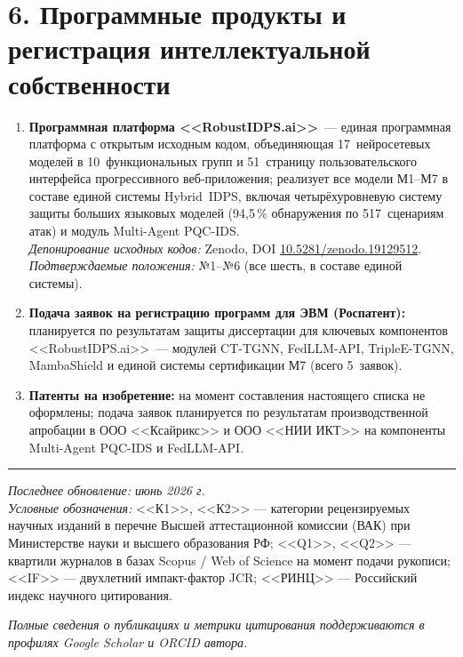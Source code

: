 \documentclass[11pt,a4paper]{article}
\begin{document}
\section*{6. Программные продукты и регистрация интеллектуальной собственности}

\begin{enumerate}[leftmargin=*, itemsep=0.3em]

\item \textbf{Программная платформа <<RobustIDPS.ai>>}~--- единая программная платформа с открытым исходным кодом, объединяющая 17~нейросетевых моделей в 10~функциональных групп и 51~страницу пользовательского интерфейса прогрессивного веб-приложения; реализует все модели М1--М7 в составе единой системы Hybrid~IDPS, включая четырёхуровневую систему защиты больших языковых моделей (94{,}5\,\% обнаружения по 517~сценариям атак) и модуль Multi-Agent PQC-IDS. \\
\textit{Депонирование исходных кодов:} Zenodo, DOI \href{https://doi.org/10.5281/zenodo.19129512}{10.5281/zenodo.19129512}. \\
\textit{Подтверждаемые положения:} №1--№6 (все шесть, в составе единой системы).

\item \textbf{Подача заявок на регистрацию программ для ЭВМ (Роспатент):} планируется по результатам защиты диссертации для ключевых компонентов <<RobustIDPS.ai>>~--- модулей CT-TGNN, FedLLM-API, TripleE-TGNN, MambaShield и единой системы сертификации М7 (всего 5~заявок).

\item \textbf{Патенты на изобретение:} на момент составления настоящего списка не оформлены; подача заявок планируется по результатам производственной апробации в ООО <<Ксайрикс>> и ООО <<НИИ ИКТ>> на компоненты Multi-Agent PQC-IDS и FedLLM-API.

\end{enumerate}

\vspace{0.4cm}
\hrule
\vspace{0.2cm}

\small
\textit{Последнее обновление: июнь 2026 г.}\\
\textit{Условные обозначения:} <<К1>>, <<К2>> --- категории рецензируемых научных изданий в перечне Высшей аттестационной комиссии (ВАК) при Министерстве науки и высшего образования РФ; <<Q1>>, <<Q2>> --- квартили журналов в базах Scopus / Web of Science на момент подачи рукописи; <<IF>> --- двухлетний импакт-фактор JCR; <<РИНЦ>> --- Российский индекс научного цитирования.

\textit{Полные сведения о публикациях и метрики цитирования поддерживаются в профилях Google Scholar и ORCID автора.}
\end{document}
